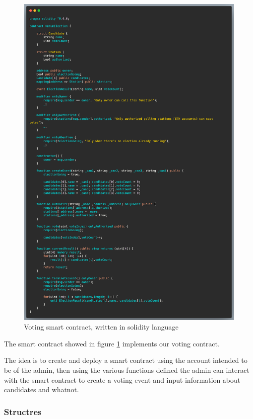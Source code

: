 \begin{figure}[H]
	\centering
		\includegraphics[width=12cm]{images/chapter3/smart-contract.png}
		\caption{{\footnotesize Voting smart contract, written in solidity language}}
		\label{smart_contract}
\end{figure}

The smart contract showed in figure \ref{smart_contract} implements our voting contract.

The idea is to create and deploy a smart contract using the account intended to be of the admin, then using the various functions defined the admin can interact with the smart contract to create a voting event and input information about candidates and whatnot.

\subsubsection{Structres}

